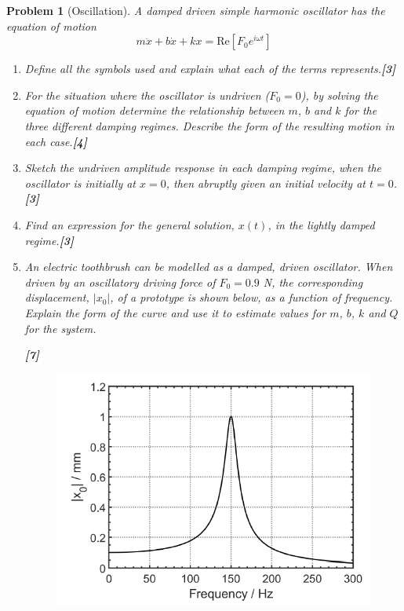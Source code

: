 \documentclass[a4paper]{article}
\theoremstyle{new}
\newtheorem{qns}{Problem}[subsection]
\begin{document}
\begin{qns}[Oscillation]
A damped driven simple harmonic oscillator has the equation of motion
$$m\ddot{x}+b\dot{x}+kx=\text{Re}[F_0e^{i\omega t}]$$
\begin{enumerate}[label=(\alph*)]
\item Define all the symbols used and explain what each of the terms represents.\hfill\textbf{[3]}
\item For the situation where the oscillator is undriven ($F_0 = 0$), by solving the equation of motion determine the relationship between $m$, $b$ and $k$ for the three different damping regimes. Describe the form of the resulting motion in each case.\hfill\textbf{[4]}
\item Sketch the undriven amplitude response in each damping regime, when the oscillator is initially at $x = 0$, then abruptly given an initial velocity at $t = 0$.\hfill\textbf{[3]}
\item Find an expression for the general solution, $x (t)$, in the lightly damped regime.\hfill\textbf{[3]}
\item An electric toothbrush can be modelled as a damped, driven oscillator. When driven by an oscillatory driving force of $F_0 = 0.9$ N, the corresponding displacement, $|x_0|$, of a prototype is shown below, as a function of frequency.\\[5pt]
Explain the form of the curve and use it to estimate values for $m$, $b$, $k$ and $Q$ for the system. 

\hfill\textbf{[7]}
\begin{figure}[H]
    \centering
    \includegraphics[scale=0.5]{2019P2B7Q.PNG}
\end{figure}
\end{enumerate}
\end{qns}
\end{document}
